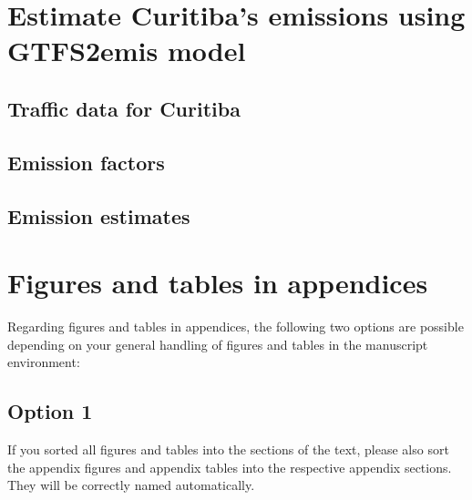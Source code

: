 \documentclass[gc, manuscript]{copernicus}
\begin{document}
\section{Estimate Curitiba's emissions using GTFS2emis model}

\subsection{Traffic data for Curitiba}

\subsection{Emission factors}

\subsection{Emission estimates}








\appendix
\section{Figures and tables in appendices}

Regarding figures and tables in appendices, the following two options
are possible depending on your general handling of figures and tables in
the manuscript environment:

\subsection{Option 1}

If you sorted all figures and tables into the sections of the text,
please also sort the appendix figures and appendix tables into the
respective appendix sections. They will be correctly named
automatically.
\end{document}
